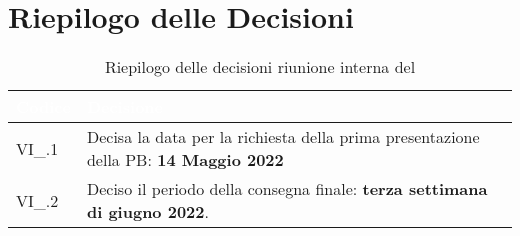 \section{Riepilogo delle Decisioni}


\begin{table}[!htbp]
    \renewcommand{\arraystretch}{1.5}
    \begin{tabular}{m{}<{\centering}  m{}<{\centering}}
        \rowcolor{darkblue} \textcolor{white}{\textbf{Codice}} & \textcolor{white}{\textbf{Decisione}}                        \\
        \hline
        VI\_{}\D{}.1                                           & Decisa la data per la richiesta della prima presentazione della PB: \textbf{14 Maggio 2022} \\
        VI\_{}\D{}.2											  & Deciso il periodo della consegna finale: \textbf{terza settimana di giugno 2022}.
    \end{tabular}
    \caption{Riepilogo delle decisioni riunione interna del \D}
\end{table}